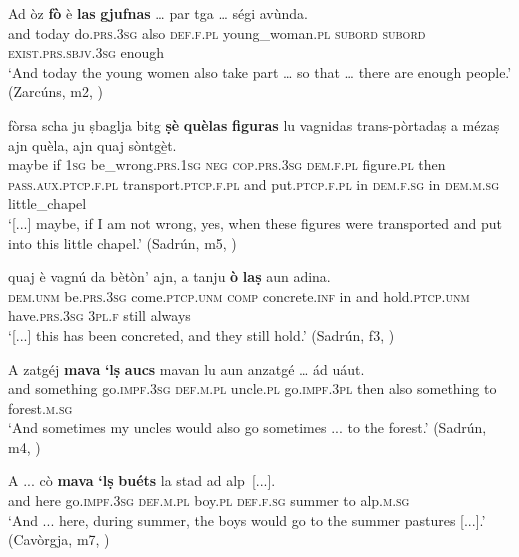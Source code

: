 \ea
\label{ex:3sg:e}
\gll    Ad òz \textbf{fò} è \textbf{las} \textbf{gjufnas} … par tga … ségi avùnda.\\
and today do.\textsc{prs.3sg} also  \textsc{def.f.pl} young\_woman.\textsc{pl} {} \textsc{subord} \textsc{subord} {} \textsc{exist.prs.sbjv.3sg} enough\\
\glt `And today the young women also take part … so that … there are enough people.' (Zarcúns, m2, )
\z

\ea
\label{ex:subjsing9}
\gll  [...] fòrsa scha ju ṣbaglja bitg \textbf{ṣè} \textbf{quèlas} \textbf{figuras} lu vagnidas trans-pòrtadaṣ a mézaṣ ajn quèla, ajn quaj sòntgè̱t.\\
{} maybe if \textsc{1sg} be\_wrong.\textsc{prs.1sg} \textsc{neg} \textsc{cop.prs.3sg} \textsc{dem.f.pl} figure.\textsc{pl} then \textsc{pass.aux.ptcp.f.pl} transport.\textsc{ptcp.f.pl} and put.\textsc{ptcp.f.pl} in \textsc{dem.f.sg} in \textsc{dem.m.sg} little\_chapel\\
\glt `[...] maybe, if I am not wrong, yes, when these figures were transported and put into this little chapel.' (Sadrún, m5, )
\z

\ea
\label{ex:subjsing10}
\gll  [...] quaj è vagnú da bètòn’ ajn, a tanju \textbf{ò} \textbf{laṣ} aun adina. \\
{} \textsc{dem.unm} be.\textsc{prs.3sg} come.\textsc{ptcp.unm} \textsc{comp} concrete.\textsc{inf} in and hold.\textsc{ptcp.unm} have.\textsc{prs.3sg} \textsc{3pl.f} still always \\
\glt `[...] this has been concreted, and they still hold.' (Sadrún, f3, )
\z

\ea
\label{ex:subjsing11}
\gll   A zatgéj \textbf{mava} \textbf{`lṣ} \textbf{aucs} mavan lu aun anzatgé … ád uáut.\\
and something go.\textsc{impf.3sg}  \textsc{def.m.pl} uncle.\textsc{pl}  go.\textsc{impf.3pl} then also something {} to forest.\textsc{m.sg} \\
\glt `And sometimes my uncles would also go sometimes ... to the forest.' (Sadrún, m4, )
\z

\ea
\label{ex:subjsing12}
\gll  A ... cò \textbf{mava} \textbf{`lṣ} \textbf{buéts} la stad ad alp~[...].  \\
and {} here go.\textsc{impf.3sg} \textsc{def.m.pl} boy.\textsc{pl} \textsc{def.f.sg} summer to alp.\textsc{m.sg}\\
\glt `And ... here, during summer, the boys would go to the summer pastures [...].' (Cavòrgja, m7, )
\z
 

